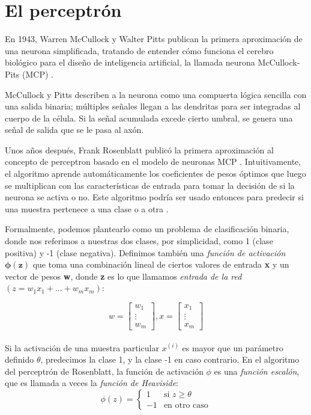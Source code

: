 \section{El perceptrón}
En 1943, Warren McCullock y Walter Pitts publican la primera
aproximación de una neurona simplificada, tratando de entender cómo
funciona el cerebro biológico para el diseño de inteligencia
artificial, la llamada neurona McCullock-Pits (MCP) \cite{mcp}.

McCullock y Pitts describen a la neurona como una compuerta lógica
sencilla con una salida binaria; múltiples señales llegan a las
dendritas para ser integradas al cuerpo de la célula. Si la señal
acumulada excede cierto umbral, se genera una señal de salida que se
le pasa al axón.

Unos años después, Frank Rosenblatt publicó la primera aproximación al
concepto de perceptron basado en el modelo de neuronas MCP
\cite{rosenblatt}. Intuitivamente, el algoritmo aprende
automáticamente los coeficientes de pesos óptimos que luego se
multiplican con las características de entrada para tomar la decisión
de si la neurona se activa o no. Este algoritmo podría ser usado
entonces para predecir si una muestra pertenece a una clase o a otra
\cite{python}.

Formalmente, podemos plantearlo como un problema de clasificación
binaria, donde nos referimos a nuestras dos clases, por simplicidad,
como 1 (clase positiva) y -1 (clase negativa). Definimos también una
\textit{función de activación $\mathbf{\phi (z)}$} que toma una
combinación lineal de ciertos valores de entrada \textbf{x} y un
vector de pesos \textbf{w}, donde \textbf{z} es lo que llamamos
\textit{entrada de la red} $(z = w_1x_1 + ... + w_mx_m)$:

\begin{equation*}
w=
    \begin{bmatrix}
        w_1 \\ \vdots \\ w_m
    \end{bmatrix}
    , x=
    \begin{bmatrix}
      x_1 \\ \vdots \\ x_m
    \end{bmatrix}
\end{equation*}
\\ Si la activación de una muestra particular $x^{(i)}$ es mayor que
un parámetro definido $\theta$, predecimos la clase 1, y la clase -1
en caso contrario. En el algoritmo del perceptrón de Rosenblatt, la
función de activación $\phi$ es una \textit{función escalón},
que es llamada a veces la \textit{función de Heaviside}:
\begin{equation*}
  \phi(z)= \left\{ \begin{array} {rl} 1 & \text{si } z \geq \theta
    \\ -1 & \text{en otro caso} \end{array} \right.
\end{equation*}

